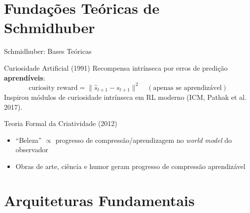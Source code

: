\documentclass[aspectratio=169]{beamer}
\begin{document}
\section{Fundações Teóricas de Schmidhuber}

\begin{frame}{Schmidhuber: Bases Teóricas}
  \vspace{-0.3em}
  \begin{block}{Curiosidade Artificial (1991)}
    Recompensa intrínseca por erros de predição \textbf{aprendíveis}:
    \begin{equation}
      \text{curiosity reward} = \|\hat{s}_{t+1} - s_{t+1}\|^2 \quad (\text{apenas se aprendizável})
    \end{equation}
    Inspirou módulos de curiosidade intrínseca em RL moderno (ICM, Pathak et al. 2017).
  \end{block}

  \begin{block}{Teoria Formal da Criatividade (2012)}
    \begin{itemize}
      \item ``Beleza'' $\propto$ progresso de compressão/aprendizagem no \textit{world model} do observador
      \item Obras de arte, ciência e humor geram progresso de compressão aprendizável
    \end{itemize}
  \end{block}
\end{frame}

\section{Arquiteturas Fundamentais}
\end{document}
